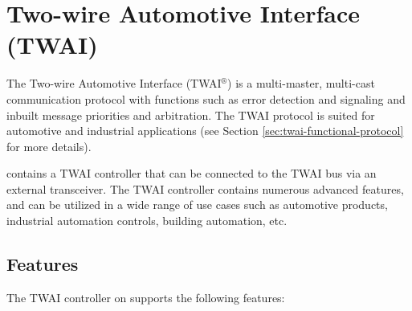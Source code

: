 \documentclass[main\_\_EN.tex]{subfiles}
\begin{document}

\ifglobal
\else
    {\let\clearpage\relax \listoftodos}
    \tableofcontents
\fi



\hypertarget{twai}{}
\chapter{Two-wire Automotive Interface (TWAI)}
\label{mod:twai}


The Two-wire Automotive Interface (TWAI$^\circledR$) is a multi-master, multi-cast communication protocol with functions such as error detection and signaling and inbuilt message priorities and arbitration. The TWAI protocol is suited for automotive and industrial applications (see Section \ref{sec:twai-functional-protocol} for more details).

\chipname{} contains a TWAI controller that can be connected to the TWAI bus via an external transceiver. The TWAI controller contains numerous advanced features, and can be utilized in a wide range of use cases such as automotive products, industrial automation controls, building automation, etc.

\section{Features}
The TWAI controller on \chipname{} supports the following features:
\end{document}
